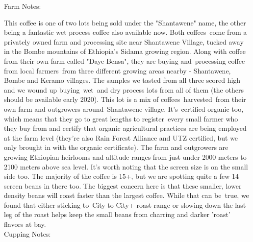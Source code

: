 \documentclass[10pt,twoside,footinclude=true,headinclude=true]{scrbook} %
\newlength{\mysize}
\newcommand{\myfontsize}[1]{
  \setlength{\mysize}{#1pt}
  \fontsize{\mysize}{1.2\mysize}
  \selectfont
}
\begin{document}
\newpage
\vspace*{-2.2em}
\linespread{1.2}
\raggedright
\normalsize
Farm Notes: \\
\myfontsize{7.8}
This coffee is one of two lots being sold under the "Shantawene" name, the other being a fantastic wet process coffee also available now. Both coffees come from a privately owned farm and processing site near Shantawene Village, tucked away in the Bombe mountains of Ethiopia's Sidama growing region. Along with coffee from their own farm called "Daye Bensa", they are buying and processing coffee from local farmers from three different growing areas nearby - Shantawene, Bombe and Keramo villages. The samples we tasted from all three scored high and we wound up buying wet and dry process lots from all of them (the others should be available early 2020). This lot is a mix of coffees harvested from their own farm and outgrowers around Shantawene village. It's certified organic too, which means that they go to great lengths to register every small farmer who they buy from and certify that organic agricultural practices are being employed at the farm level (they're also Rain Forest Alliance and UTZ certified, but we only brought in with the organic certificate). The farm and outgrowers are growing Ethiopian heirlooms and altitude ranges from just under 2000 meters to 2100 meters above sea level. It's worth noting that the screen size is on the small side too. The majority of the coffee is 15+, but we are spotting quite a few 14 screen beans in there too. The biggest concern here is that these smaller, lower density beans will roast faster than the largest coffee. While that can be true, we found that either sticking to City to City+ roast range or slowing down the last leg of the roast helps keep the small beans from charring and darker 'roast' flavors at bay. \\
\medskip
\normalsize
Cupping Notes: \\
\myfontsize{7.8}
\end{document}
